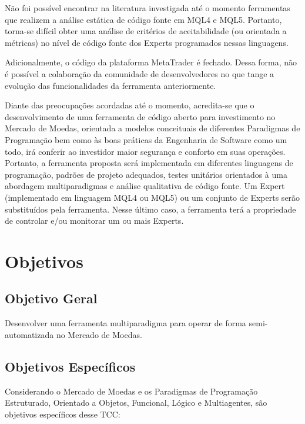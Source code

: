 Não foi possível encontrar na literatura investigada até o momento ferramentas que realizem a análise estática de código fonte em MQL4 e MQL5. Portanto, torna-se difícil obter uma análise de critérios de aceitabilidade (ou orientada a métricas) no nível de código fonte dos Experts programados nessas linguagens.

Adicionalmente, o código da plataforma MetaTrader é fechado. Dessa forma, não é possível a colaboração da comunidade de desenvolvedores no que tange a evolução das funcionalidades da ferramenta anteriormente.

Diante das preocupações acordadas até o momento, acredita-se que o desenvolvimento de uma ferramenta de código aberto para investimento no Mercado de Moedas, orientada a modelos conceituais de diferentes Paradigmas de Programação bem como às boas práticas da Engenharia de Software como um todo, irá conferir ao investidor maior segurança e conforto em suas operações. Portanto, a ferramenta proposta será implementada em diferentes linguagens de programação, padrões de projeto adequados, testes unitários orientados à uma abordagem multiparadigmas e análise qualitativa de código fonte. Um Expert (implementado em linguagem MQL4 ou MQL5) ou um conjunto de Experts serão substituídos pela ferramenta. Nesse último caso, a ferramenta terá a propriedade de controlar e/ou monitorar um ou mais Experts.

\section{Objetivos}

\subsection{Objetivo Geral}

Desenvolver uma ferramenta multiparadigma  para operar de forma semi-automatizada no Mercado de Moedas.


\subsection{Objetivos Específicos}

Considerando o Mercado de Moedas e os Paradigmas de Programação Estruturado,  Orientado a Objetos,  Funcional, Lógico  e  Multiagentes, são objetivos específicos desse TCC:

